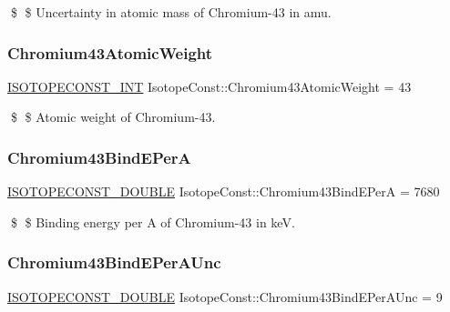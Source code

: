 \$ \$ Uncertainty in atomic mass of Chromium-\/43 in amu. \mbox{\label{group___isotope_const-_chromium-_cr43_gad9f5f13c5b1d954212b8ce09bfddb9b6}} 
\subsubsection{\texorpdfstring{Chromium43\+Atomic\+Weight}{Chromium43AtomicWeight}}
{\footnotesize\ttfamily \mbox{\hyperlink{group___isotope_const-_macros_ga5f18360b3e99483a35c32d789e62621c}{I\+S\+O\+T\+O\+P\+E\+C\+O\+N\+S\+T\+\_\+\+I\+NT}} Isotope\+Const\+::\+Chromium43\+Atomic\+Weight = 43}

\$ \$ Atomic weight of Chromium-\/43. \mbox{\label{group___isotope_const-_chromium-_cr43_ga4038cdfd511350fad1f948b25c86d64f}} 
\subsubsection{\texorpdfstring{Chromium43\+Bind\+E\+PerA}{Chromium43BindEPerA}}
{\footnotesize\ttfamily \mbox{\hyperlink{group___isotope_const-_macros_ga8f45a7272ce02c0b4c65c44636ed719a}{I\+S\+O\+T\+O\+P\+E\+C\+O\+N\+S\+T\+\_\+\+D\+O\+U\+B\+LE}} Isotope\+Const\+::\+Chromium43\+Bind\+E\+PerA = 7680}

\$ \$ Binding energy per A of Chromium-\/43 in keV. \mbox{\label{group___isotope_const-_chromium-_cr43_ga7bb93697397d10cb4ff82f7eb24b701d}} 
\subsubsection{\texorpdfstring{Chromium43\+Bind\+E\+Per\+A\+Unc}{Chromium43BindEPerAUnc}}
{\footnotesize\ttfamily \mbox{\hyperlink{group___isotope_const-_macros_ga8f45a7272ce02c0b4c65c44636ed719a}{I\+S\+O\+T\+O\+P\+E\+C\+O\+N\+S\+T\+\_\+\+D\+O\+U\+B\+LE}} Isotope\+Const\+::\+Chromium43\+Bind\+E\+Per\+A\+Unc = 9}

